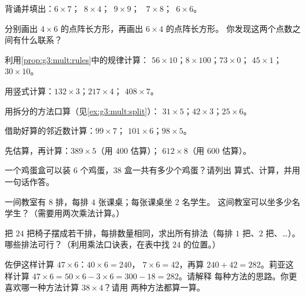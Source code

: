 \begin{exercise}[$\star$]\label{exo:g3:mult:2}
背诵并填出：$6 \times 7$；\ $8 \times 4$；\ $9 \times 9$；
\ $7 \times 8$；\ $6 \times 6$。
\end{exercise}

\begin{exercise}[$\star$]\label{exo:g3:mult:3}
分别画出 $4 \times 6$ 的点阵长方形，再画出 $6 \times 4$ 的点阵长方形。
你发现这两个点数之间有什么联系？
\end{exercise}

\begin{exercise}[$\star$]\label{exo:g3:mult:4}
利用\cref{prop:g3:mult:rules}中的规律计算：
$56 \times 10$；\quad $8 \times 100$；\quad $73 \times 0$；\quad
$45 \times 1$；\quad $30 \times 10$。
\end{exercise}

\begin{exercise}[$\star$]\label{exo:g3:mult:5}
用竖式计算：$132 \times 3$；\quad $217 \times 4$；\quad
$408 \times 7$。
\end{exercise}

\begin{exercise}[$\star$]\label{exo:g3:mult:6}
用拆分的方法口算（见\cref{ex:g3:mult:split}）：
$31 \times 5$；\quad $42 \times 3$；\quad $25 \times 6$。
\end{exercise}

\begin{exercise}[$\star$]\label{exo:g3:mult:7}
借助好算的邻近数计算：$99 \times 7$；\quad
$101 \times 6$；\quad $98 \times 5$。
\end{exercise}

\begin{exercise}[$\star$]\label{exo:g3:mult:8}
先估算，再计算：$389 \times 5$（用 $400$ 估算）；
$612 \times 8$（用 $600$ 估算）。
\end{exercise}

\begin{exercise}[$\star$]\label{exo:g3:mult:9}
一个鸡蛋盒可以装 $6$ 个鸡蛋，$38$ 盒一共有多少个鸡蛋？请列出
算式、计算，并用一句话作答。
\end{exercise}

\begin{exercise}[$\star\star$]\label{exo:g3:mult:10}
一间教室有 $8$ 排，每排 $4$ 张课桌；每张课桌坐 $2$ 名学生。
这间教室可以坐多少名学生？（需要用两次乘法计算。）
\end{exercise}

\begin{exercise}[$\star\star$]\label{exo:g3:mult:11}
把 $24$ 把椅子摆成若干排，每排数量相同，求出所有排法（每排
$1$ 把、$2$ 把、\dots）。哪些排法可行？（利用乘法口诀表，在表中找
$24$ 的位置。）
\end{exercise}

\begin{exercise}[$\star\star$]\label{exo:g3:mult:12}
佐伊这样计算 $47 \times 6$：$40 \times 6 = 240$，
$7 \times 6 = 42$，再算 $240 + 42 = 282$。莉亚这样计算
$47 \times 6 = 50 \times 6 - 3 \times 6 = 300 - 18 = 282$。请解释
每种方法的思路。你更喜欢哪一种方法计算 $38 \times 4$？请用
两种方法都算一算。
\end{exercise}
